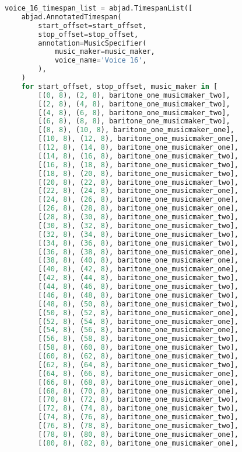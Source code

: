 \begin{lstlisting}[language=Python, caption=Invocation Source Code]
voice_16_timespan_list = abjad.TimespanList([
    abjad.AnnotatedTimespan(
        start_offset=start_offset,
        stop_offset=stop_offset,
        annotation=MusicSpecifier(
            music_maker=music_maker,
            voice_name='Voice 16',
        ),
    )
    for start_offset, stop_offset, music_maker in [
        [(0, 8), (2, 8), baritone_one_musicmaker_two],
        [(2, 8), (4, 8), baritone_one_musicmaker_two],
        [(4, 8), (6, 8), baritone_one_musicmaker_two],
        [(6, 8), (8, 8), baritone_one_musicmaker_two],
        [(8, 8), (10, 8), baritone_one_musicmaker_one],
        [(10, 8), (12, 8), baritone_one_musicmaker_one],
        [(12, 8), (14, 8), baritone_one_musicmaker_one],
        [(14, 8), (16, 8), baritone_one_musicmaker_two],
        [(16, 8), (18, 8), baritone_one_musicmaker_two],
        [(18, 8), (20, 8), baritone_one_musicmaker_two],
        [(20, 8), (22, 8), baritone_one_musicmaker_two],
        [(22, 8), (24, 8), baritone_one_musicmaker_one],
        [(24, 8), (26, 8), baritone_one_musicmaker_one],
        [(26, 8), (28, 8), baritone_one_musicmaker_one],
        [(28, 8), (30, 8), baritone_one_musicmaker_two],
        [(30, 8), (32, 8), baritone_one_musicmaker_two],
        [(32, 8), (34, 8), baritone_one_musicmaker_two],
        [(34, 8), (36, 8), baritone_one_musicmaker_two],
        [(36, 8), (38, 8), baritone_one_musicmaker_one],
        [(38, 8), (40, 8), baritone_one_musicmaker_one],
        [(40, 8), (42, 8), baritone_one_musicmaker_one],
        [(42, 8), (44, 8), baritone_one_musicmaker_two],
        [(44, 8), (46, 8), baritone_one_musicmaker_two],
        [(46, 8), (48, 8), baritone_one_musicmaker_two],
        [(48, 8), (50, 8), baritone_one_musicmaker_two],
        [(50, 8), (52, 8), baritone_one_musicmaker_one],
        [(52, 8), (54, 8), baritone_one_musicmaker_one],
        [(54, 8), (56, 8), baritone_one_musicmaker_one],
        [(56, 8), (58, 8), baritone_one_musicmaker_two],
        [(58, 8), (60, 8), baritone_one_musicmaker_two],
        [(60, 8), (62, 8), baritone_one_musicmaker_two],
        [(62, 8), (64, 8), baritone_one_musicmaker_two],
        [(64, 8), (66, 8), baritone_one_musicmaker_one],
        [(66, 8), (68, 8), baritone_one_musicmaker_one],
        [(68, 8), (70, 8), baritone_one_musicmaker_one],
        [(70, 8), (72, 8), baritone_one_musicmaker_two],
        [(72, 8), (74, 8), baritone_one_musicmaker_two],
        [(74, 8), (76, 8), baritone_one_musicmaker_two],
        [(76, 8), (78, 8), baritone_one_musicmaker_two],
        [(78, 8), (80, 8), baritone_one_musicmaker_one],
        [(80, 8), (82, 8), baritone_one_musicmaker_one],

\end{lstlisting}
